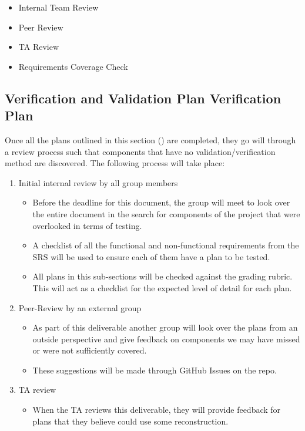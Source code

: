 \documentclass[12pt, titlepage]{article}
\begin{document}

\begin{itemize}
    \item Internal Team Review
    \item Peer Review
    \item TA Review
    \item Requirements Coverage Check
\end{itemize}

\subsection{Verification and Validation Plan Verification Plan}
\label{ssub:vnv_plan_verificaiton_plan}

Once all the plans outlined in this section () are completed, they go will through a review process such that components that have no validation/verification method are discovered. The following process will take place:

\begin{enumerate}
    \item Initial internal review by all group members
    \begin{itemize}
        \item Before the deadline for this document, the group will meet to look over the entire document in the search for components of the project that were overlooked in terms of testing.
        \item A checklist of all the functional and non-functional requirements from the SRS will be used to ensure each of them have a plan to be tested.
        \item All plans in this sub-sections will be checked against the grading rubric. This will act as a checklist for the expected level of detail for each plan.
    \end{itemize}
    \item Peer-Review by an external group
    \begin{itemize}
        \item As part of this deliverable another group will look over the plans from an outside perspective and give feedback on components we may have missed or were not sufficiently covered.
        \item These suggestions will be made through GitHub Issues on the repo.
    \end{itemize}
    \item TA review
    \begin{itemize}
        \item When the TA reviews this deliverable, they will provide feedback for plans that they believe could use some reconstruction.
    \end{itemize}
\end{enumerate}
\end{document}
